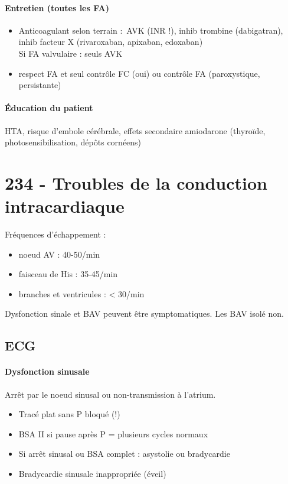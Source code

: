\paragraph{Entretien (toutes les FA)}
\begin{itemize}
  \item Anticoagulant selon terrain : AVK (INR !), inhib trombine (dabigatran), inhib
facteur X (rivaroxaban, apixaban, edoxaban)\\
Si FA valvulaire : seuls AVK
\item respect FA et seul contrôle FC (oui) ou contrôle FA (paroxystique,
  persistante)
\end{itemize}

\paragraph{Éducation du patient}
HTA, risque d'embole cérébrale, effets secondaire amiodarone (thyroïde,
photosensibilisation, dépôts cornéens)

\section{234 - Troubles de la conduction intracardiaque}%
\label{sec:234_troubles_de_la_conduction_intracardiaque}
Fréquences d'échappement :
\begin{itemize}
  \item noeud AV : 40-50/min
  \item faisceau de His : 35-45/min
  \item branches et ventricules : < 30/min
\end{itemize}
Dysfonction sinale et BAV peuvent être symptomatiques. Les BAV isolé non.

\subsection{ECG}%
\paragraph{Dysfonction sinusale}
Arrêt par le noeud sinusal ou non-transmission à l'atrium.

\begin{itemize}
  \item Tracé plat sans P bloqué (!)
  \item BSA II si pause après P = plusieurs cycles normaux
  \item Si arrêt sinusal ou BSA complet : asystolie ou bradycardie
  \item Bradycardie sinusale inappropriée (éveil)
\end{itemize}

